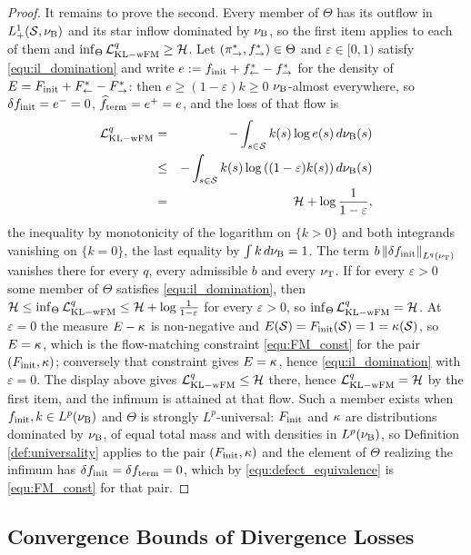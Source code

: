 \begin{proof}
It remains to prove the second. Every member of $\Theta$ has its outflow in
$L^1_+(\mathcal S,\nu_{\mathrm{B}})$ and its star inflow dominated by $\nu_{\mathrm{B}}$, so the first item applies
to each of them and $\inf_\Theta\mathcal L_{\mathrm{KL-wFM}}^q\geq\mathcal H$. Let
$(\pi_{\rightarrow}^*,f^*_{\rightarrow})\in\Theta$ and $\varepsilon\in[0,1)$ satisfy
\eqref{equ:il_domination} and write $e := f_{\mathrm{init}}+f^*_{\leftarrow}-f^*_{\rightarrow}$ for the density of
$E = F_{\mathrm{init}}+F^*_{\leftarrow}-F^*_{\rightarrow}$: then $e\geq(1-\varepsilon)k\geq0$ $\nu_{\mathrm{B}}$-almost everywhere,
so $\delta f_{\mathrm{init}} = e^- = 0$, $\widehat{f}_{\mathrm{term}} = e^+ = e$, and the loss of that flow is
\begin{eqnarray}
    \mathcal L_{\mathrm{KL-wFM}}^q &=& -\int_{s\in\mathcal S} k(s)\log e(s)\,d\nu_{\mathrm{B}}(s) \nonumber\\
    &\leq& -\int_{s\in\mathcal S} k(s)\log\left((1-\varepsilon)k(s)\right)d\nu_{\mathrm{B}}(s) \nonumber\\
    &=& \mathcal H+\log\frac{1}{1-\varepsilon} ,
\end{eqnarray}
the inequality by monotonicity of the logarithm on $\{k>0\}$ and both integrands vanishing
on $\{k=0\}$, the last equality by $\int k\,d\nu_{\mathrm{B}} = 1$. The term
$b\left\|\delta f_{\mathrm{init}}\right\|_{L^{q}(\nu_{\mathrm{T}})}$ vanishes there for every $q$, every
admissible $b$ and every $\nu_{\mathrm{T}}$. If for every $\varepsilon>0$ some member of $\Theta$
satisfies \eqref{equ:il_domination}, then
$\mathcal H\leq\inf_\Theta\mathcal L_{\mathrm{KL-wFM}}^q\leq\mathcal H+\log\frac{1}{1-\varepsilon}$ for every
$\varepsilon>0$, so $\inf_\Theta\mathcal L_{\mathrm{KL-wFM}}^q = \mathcal H$. At $\varepsilon = 0$ the measure
$E-\kappa$ is non-negative and
$E(\mathcal S) = F_{\mathrm{init}}(\mathcal S) = 1 = \kappa(\mathcal S)$, so $E = \kappa$, which is
the flow-matching constraint \eqref{equ:FM_const} for the pair $(F_{\mathrm{init}},\kappa)$;
conversely that constraint gives $E = \kappa$, hence \eqref{equ:il_domination} with
$\varepsilon = 0$. The display above gives $\mathcal L_{\mathrm{KL-wFM}}^q\leq\mathcal H$ there, hence
$\mathcal L_{\mathrm{KL-wFM}}^q = \mathcal H$ by the first item, and the infimum is attained at that flow.
Such a member exists when $f_{\mathrm{init}},k\in L^p(\nu_{\mathrm{B}})$ and $\Theta$ is strongly
$L^p$-universal: $F_{\mathrm{init}}$ and $\kappa$ are distributions dominated by $\nu_{\mathrm{B}}$, of equal
total mass and with densities in $L^p(\nu_{\mathrm{B}})$, so Definition \ref{def:universality} applies
to the pair $(F_{\mathrm{init}},\kappa)$ and the element of $\Theta$ realizing the infimum has
$\delta f_{\mathrm{init}} = \delta f_{\mathrm{term}} = 0$, which by \eqref{equ:defect_equivalence} is
\eqref{equ:FM_const} for that pair.
\end{proof}

\subsection{Convergence Bounds of Divergence Losses}\label{app:divergence}

